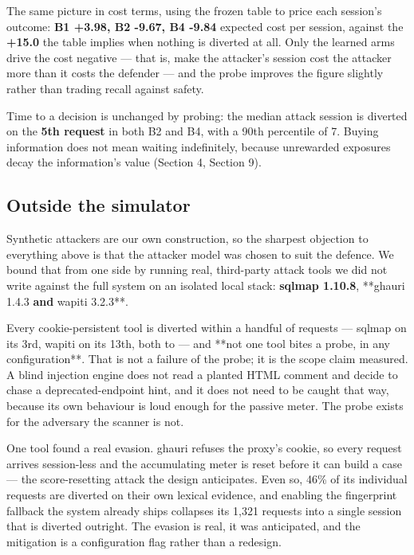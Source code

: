 The same picture in cost terms, using the frozen table to price each session's
outcome: \textbf{B1 +3.98, B2 -9.67, B4 -9.84} expected cost per session, against the
\textbf{+15.0} the table implies when nothing is diverted at all. Only the learned arms
drive the cost negative --- that is, make the attacker's session cost the attacker
more than it costs the defender --- and the probe improves the figure slightly rather
than trading recall against safety.

Time to a decision is unchanged by probing: the median attack session is diverted on
the \textbf{5th request} in both B2 and B4, with a 90th percentile of 7. Buying
information does not mean waiting indefinitely, because unrewarded exposures decay
the information's value (Section 4, Section 9).


\subsection{Outside the simulator}

Synthetic attackers are our own construction, so the sharpest objection to
everything above is that the attacker model was chosen to suit the defence. We
bound that from one side by running real, third-party attack tools we did not write
against the full system on an isolated local stack: \textbf{sqlmap 1.10.8}, **ghauri
1.4.3\textbf{ and }wapiti 3.2.3**.

Every cookie-persistent tool is diverted within a handful of requests --- sqlmap on
its 3rd, wapiti on its 13th, both to  --- and **not one tool bites a probe,
in any configuration**. That is not a failure of the probe; it is the scope claim
measured. A blind injection engine does not read a planted HTML comment and decide
to chase a deprecated-endpoint hint, and it does not need to be caught that way,
because its own behaviour is loud enough for the passive meter. The probe exists for
the adversary the scanner is not.

One tool found a real evasion. ghauri refuses the proxy's cookie, so every request
arrives session-less and the accumulating meter is reset before it can build a case
--- the score-resetting attack the design anticipates. Even so, 46\% of its individual
requests are diverted on their own lexical evidence, and enabling the fingerprint
fallback the system already ships collapses its 1,321 requests into a single session
that is diverted outright. The evasion is real, it was anticipated, and the
mitigation is a configuration flag rather than a redesign.

